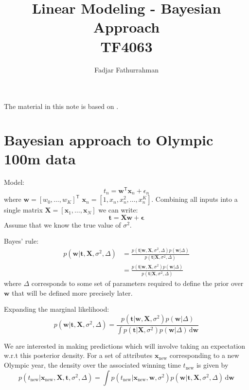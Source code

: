 \documentclass[a4paper,11pt]{article} %
\begin{document}
\title{Linear Modeling - Bayesian Approach\\
TF4063}
\author{Fadjar Fathurrahman}
\date{}
\maketitle

The material in this note is based on \cite{Rogers2017}.

\section{Bayesian approach to Olympic 100m data}

Model:
\begin{equation}
t_{n} = \mathbf{w}^{\mathsf{T}}\mathbf{x}_{n} + \epsilon_{n}
\end{equation}
where $\mathbf{w} = \left[ w_{0}, \ldots, w_{K} \right]^{\mathsf{T}}$
$\mathbf{x}_{n} = \left[ 1, x_{n}, x^{2}_{n}, \ldots, x_{n}^{K} \right]$.
Combining all inputs into a single matrix
$\mathbf{X} = \left[ \mathbf{x}_{1}, \ldots, \mathbf{x}_{N} \right]$
we can write:
\begin{equation}
\mathbf{t} = \mathbf{Xw} + \boldsymbol{\epsilon}
\end{equation}
Assume that we know the true value of $\sigma^2$.

Bayes' rule:
\begin{align}
p(\mathbf{w} | \mathbf{t}, \mathbf{X}, \sigma^2, \Delta) & = 
\frac{p(\mathbf{t}|\mathbf{w},\mathbf{X},\sigma^2,\Delta) p(\mathbf{w} | \Delta)}%
{p(\mathbf{t} | \mathbf{X},\sigma^2,\Delta)} \\
& = \frac{p(\mathbf{t}|\mathbf{w},\mathbf{X},\sigma^2) p(\mathbf{w} | \Delta)}%
{p(\mathbf{t} | \mathbf{X},\sigma^2,\Delta)}
\end{align}
where $\Delta$ corresponds to some set of parameters required to define the prior
over $\mathbf{w}$ that will be defined more precisely later.

Expanding the marginal likelihood:
\begin{equation}
p(\mathbf{w} | \mathbf{t}, \mathbf{X}, \sigma^2, \Delta) = 
\frac{p(\mathbf{t}|\mathbf{w},\mathbf{X},\sigma^2) p(\mathbf{w} | \Delta)}%
{\int p(\mathbf{t} | \mathbf{X},\sigma^2) p(\mathbf{w}|\Delta)\,\mathrm{d}\mathbf{w}}
\end{equation}

We are interested in making predictions which will involve taking an expectation
w.r.t this posterior density.
For a set of attributes $\mathbf{x}_{\mathrm{new}}$ corresponding to a new Olympic
year, the density over the associated winning time $t_{\mathrm{new}}$ is given
by
\begin{equation}
p(t_{\mathrm{new}} | \mathbf{x}_{\mathrm{new}},\mathbf{X}, \mathbf{t}, \sigma^2,\Delta) =
\int p(t_{\mathrm{new}} | \mathbf{x}_{\mathrm{new}}, \mathbf{w}, \sigma^2)
p(\mathbf{w} | \mathbf{t}, \mathbf{X}, \sigma^2, \Delta)\,\mathrm{d}\mathbf{w}
\end{equation}
\end{document}
